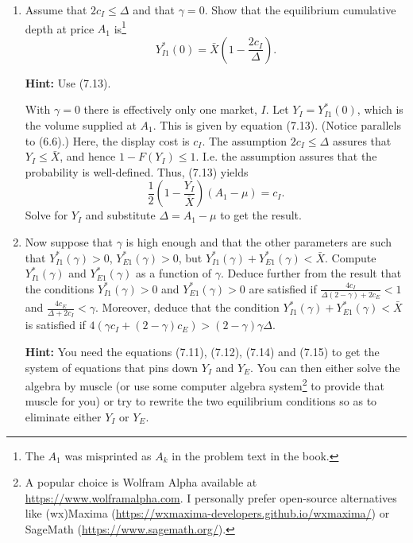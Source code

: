 \documentclass[11pt
, answers
]{exam}
\begin{document}
\begin{enumerate}[label=(\alph*). ]
	\item Assume that $2c_{I} \leq \Delta$ and that $\gamma=0$. Show that the equilibrium cumulative depth at price $A_{1}$ is\footnote{The $A_{1}$ was misprinted as $A_{k}$ in the problem text in the book.}  
	\[
	Y^{*}_{I1}(0)=\bar{X}\left( 1-\frac{2c_{I}}{\Delta}\right).
	\]
	
	\textbf{Hint:} Use (7.13).
	
	\begin{solution}
		With $\gamma=0$ there is effectively only one market, $I$. Let $Y_{I}=Y^{*}_{I1}(0)$, which is the volume supplied at $A_{1}$. This is given by equation (7.13). (Notice parallels to (6.6).) Here, the display cost is $c_{I}$. The assumption $2c_{I} \leq \Delta$ assures that $Y_{I} \leq \bar{X}$, and hence $1-F(Y_{I}) \leq 1$. I.e. the assumption assures that the probability is well-defined. Thus, (7.13) yields
		\[
		\frac{1}{2}\left(1-\frac{Y_{I}}{\bar{X}}\right) (A_{1}-\mu) = c_{I}.
		\]
		Solve for $Y_{I}$ and substitute $\Delta=A_1-\mu$ to get the result.
	\end{solution}
	
	
	\item Now suppose that $\gamma$ is high enough and that the other parameters are such that $Y^{*}_{I1}(\gamma)>0$, $Y^{*}_{E1}(\gamma)>0$, but $Y^{*}_{I1}(\gamma)+Y^{*}_{E1}(\gamma)<\bar{X}$. Compute $Y^{*}_{I1}(\gamma)$ and $Y^{*}_{E1}(\gamma)$ as a function of $\gamma$. Deduce further from the result that the conditions  $Y^{*}_{I1}(\gamma)>0$ and $Y^{*}_{E1}(\gamma)>0$ are satisfied if $\frac{4c_{I}}{\Delta(2-\gamma)+2c_{E}}<1$ and $\frac{4c_{E}}{\Delta+2c_{I}}<\gamma$. Moreover, deduce that the condition $Y^{*}_{I1}(\gamma)+Y^{*}_{E1}(\gamma)<\bar{X}$ is satisfied if $4(\gamma c_{I}+(2-\gamma)c_{E})>(2-\gamma)\gamma \Delta$.
	
	\textbf{Hint:} You need the equations (7.11), (7.12), (7.14) and (7.15) to get the system of equations that pins down $Y_I$ and $Y_E$. You can then either solve the algebra by muscle (or use some computer algebra system\footnote{A popular choice is Wolfram Alpha available at \url{https://www.wolframalpha.com}. I personally prefer open-source alternatives like (wx)Maxima (\url{https://wxmaxima-developers.github.io/wxmaxima/}) or SageMath (\url{https://www.sagemath.org/}).} to provide that muscle for you) or try to rewrite the two equilibrium conditions so as to eliminate either $Y_I$ or $Y_E$. 
	

\end{enumerate}
\end{document}
